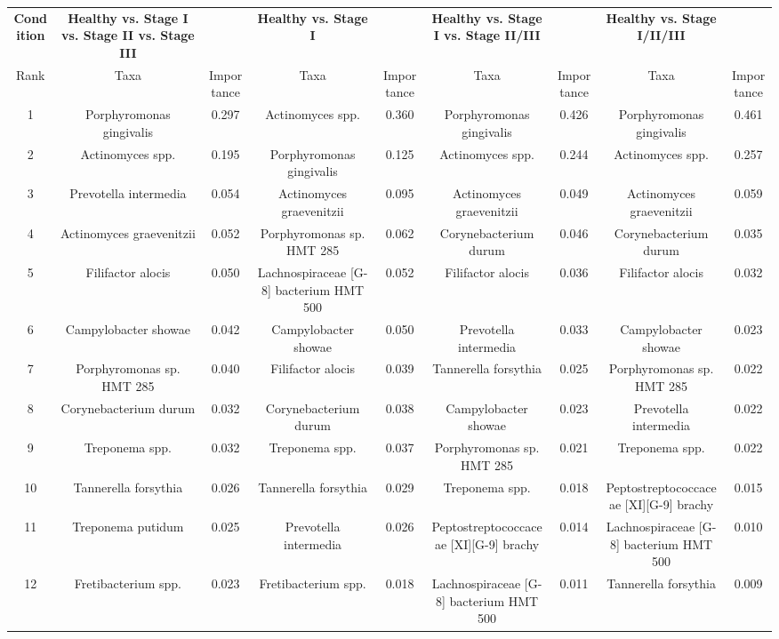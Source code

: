 \begin{tabular}{c|cc|cc|cc|cc}
    \textbf{Condition} & \textbf{Healthy vs. Stage I vs. Stage II vs. Stage III} & & \textbf{Healthy vs. Stage I} & & \textbf{Healthy vs. Stage I vs. Stage II/III} & & \textbf{Healthy vs. Stage I/II/III} & \\
    Rank & Taxa & Importance & Taxa & Importance & Taxa & Importance & Taxa & Importance \\
    \hline
    1 & Porphyromonas gingivalis & 0.297 & Actinomyces spp. & 0.360 & Porphyromonas gingivalis & 0.426 & Porphyromonas gingivalis & 0.461 \\
    2 & Actinomyces spp. & 0.195 & Porphyromonas gingivalis & 0.125 & Actinomyces spp. & 0.244 & Actinomyces spp. & 0.257 \\
    3 & Prevotella intermedia & 0.054 & Actinomyces graevenitzii & 0.095 & Actinomyces graevenitzii & 0.049 & Actinomyces graevenitzii & 0.059 \\
    4 & Actinomyces graevenitzii & 0.052 & Porphyromonas sp. HMT 285 & 0.062 & Corynebacterium durum & 0.046 & Corynebacterium durum & 0.035 \\
    5 & Filifactor alocis & 0.050 & Lachnospiraceae [G-8] bacterium HMT 500 & 0.052 & Filifactor alocis & 0.036 & Filifactor alocis & 0.032 \\
    6 & Campylobacter showae & 0.042 & Campylobacter showae & 0.050 & Prevotella intermedia & 0.033 & Campylobacter showae & 0.023 \\
    7 & Porphyromonas sp. HMT 285 & 0.040 & Filifactor alocis & 0.039 & Tannerella forsythia & 0.025 & Porphyromonas sp. HMT 285 & 0.022 \\
    8 & Corynebacterium durum & 0.032 & Corynebacterium durum & 0.038 & Campylobacter showae & 0.023 & Prevotella intermedia & 0.022 \\
    9 & Treponema spp. & 0.032 & Treponema spp. & 0.037 & Porphyromonas sp. HMT 285 & 0.021 & Treponema spp. & 0.022 \\
    10 & Tannerella forsythia & 0.026 & Tannerella forsythia & 0.029 & Treponema spp. & 0.018 & Peptostreptococcaceae [XI][G-9] brachy & 0.015 \\
    11 & Treponema putidum & 0.025 & Prevotella intermedia & 0.026 & Peptostreptococcaceae [XI][G-9] brachy & 0.014 & Lachnospiraceae [G-8] bacterium HMT 500 & 0.010 \\
    12 & Fretibacterium spp. & 0.023 & Fretibacterium spp. & 0.018 & Lachnospiraceae [G-8] bacterium HMT 500 & 0.011 & Tannerella forsythia & 0.009 \\

\end{tabular}

